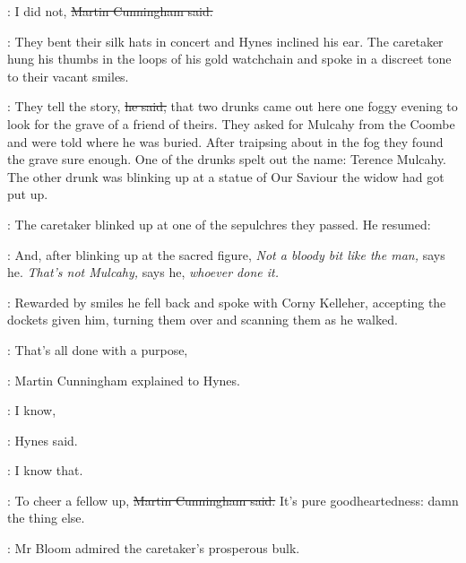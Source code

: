\cunningham:
I did not,
\sout{Martin Cunningham said.}

:
They bent their silk hats in concert and Hynes inclined his ear.
The caretaker hung his thumbs in the loops of his gold watchchain
and spoke in a discreet tone to their vacant smiles.

\oconnell:
They tell the story,
\sout{he said,}
that two drunks came out here one foggy evening
to look for the grave of a friend of theirs.
They asked for Mulcahy from the Coombe and were told where he was buried.
After traipsing about in the fog they found the grave sure enough.
One of the drunks spelt out the name:
Terence Mulcahy.
The other drunk was blinking up at a statue of Our Saviour
the widow had got put up.

:
The caretaker blinked up at one of the sepulchres they passed.
He resumed:

\oconnell:
And, after blinking up at the sacred figure,
\emph{Not a bloody bit like the man,} says he.
\emph{That's not Mulcahy,} says he,
\emph{whoever done it.}

:
Rewarded by smiles
he fell back and spoke with Corny Kelleher,
accepting the dockets given him,
turning them over and scanning them as he walked.

\cunningham:
That's all done with a purpose,

:
Martin Cunningham explained to Hynes.

\hynes:
I know,

:
Hynes said.

\hynes:
I know that.

\cunningham:
To cheer a fellow up,
\sout{Martin Cunningham said.}
It's pure goodheartedness:
damn the thing else.

:
Mr Bloom admired the caretaker's prosperous bulk.

